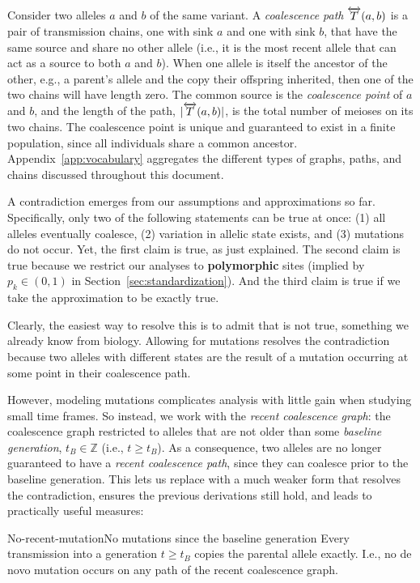 \documentclass[12pt]{article}
\numberwithin{equation}{section}
\begin{document}
Consider two alleles $a$ and $b$ of the same variant.
A \emph{coalescence path} $\overleftrightarrow{T}(a,b)$ is a pair of transmission chains, one with sink $a$ and one with sink $b$, that have the same source and share no other allele (i.e., it is the most recent allele that can act as a source to both $a$ and $b$).
When one allele is itself the ancestor of the other, e.g., a parent's allele and the copy their offspring inherited, then one of the two chains will have length zero.
The common source is the \emph{coalescence point} of $a$ and $b$, and the length of the path, $|\overleftrightarrow{T}(a,b)|$, is the total number of meioses on its two chains.
The coalescence point is unique and guaranteed to exist in a finite population, since all individuals share a common ancestor.
Appendix~\ref{app:vocabulary} aggregates the different types of graphs, paths, and chains discussed throughout this document.

A contradiction emerges from our assumptions and approximations so far.
Specifically, only two of the following statements can be true at once: (1) all alleles eventually coalesce, (2) variation in allelic state exists, and (3) mutations do not occur.
Yet, the first claim is true, as just explained.
The second claim is true because we restrict our analyses to \textbf{polymorphic} sites (implied by $p_k \in (0,1)$ in Section~\ref{sec:standardization}).
And the third claim is true if we take the  approximation to be exactly true.

Clearly, the easiest way to resolve this is to admit that  is not true, something we already know from biology.
Allowing for mutations resolves the contradiction because two alleles with different states are the result of a mutation occurring at some point in their coalescence path.

However, modeling mutations complicates analysis with little gain when studying small time frames.
So instead, we work with the \emph{recent coalescence graph}: the coalescence graph restricted to alleles that are not older than some \emph{baseline generation}, $t_B \in \mathbb{Z}$ (i.e., $t \geq t_B$).
As a consequence, two alleles are no longer guaranteed to have a \emph{recent coalescence path}, since they can coalesce prior to the baseline generation.
This lets us replace  with a much weaker form that resolves the contradiction, ensures the previous derivations still hold, and leads to practically useful measures:

\begin{assumption}{No-recent-mutation}{No mutations since the baseline generation}
Every transmission into a generation $t \geq t_B$ copies the parental allele exactly.
I.e., no de novo mutation occurs on any path of the recent coalescence graph.
\end{assumption}
\end{document}
